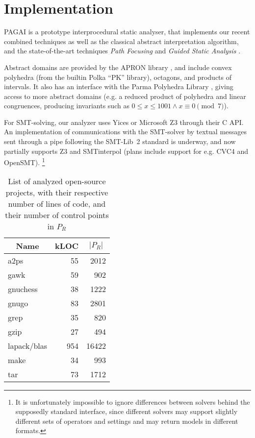 \documentclass{entcs}
\begin{document}
\section{Implementation}

PAGAI is a prototype interprocedural static analyser, that implements our
recent combined techniques \cite{Henry_Monniaux_Moy_SAS12}
as well as the classical abstract interpretation algorithm, and the state-of-the-art techniques \emph{Path Focusing} \cite{Monniaux_Gonnord_SAS11} and \emph{Guided Static Analysis} \cite{DBLP:conf/sas/GopanR07}.

Abstract domains are provided by the APRON library
\citep{DBLP:conf/cav/JeannetM09}, and include convex polyhedra (from the builtin
Polka ``PK'' library), octagons, and products of intervals. It also has
an interface with the Parma Polyhedra Library \cite{BagnaraHZ08SCP}, giving access to
more abstract domains (e.g. a reduced product of polyhedra and linear congruences, producing invariants such as $0 \leq x \leq 1001 \land x \equiv 0 \pmod 7$).

For SMT-solving, our analyzer uses
Yices \cite{DBLP:conf/cav/DutertreM06}
or Microsoft Z3\cite{DBLP:conf/tacas/MouraB08}
through their C API.
An implementation of communications with the SMT-solver by textual messages sent through a pipe following the SMT-Lib~2 standard \cite{BarST-SMTLIB,BarST-SMT-10} is underway, and now partially supports Z3 and SMTinterpol (plans include support for e.g. CVC4 and OpenSMT).%
\footnote{%
It is unfortunately impossible to ignore differences between solvers behind the supposedly standard interface, since different solvers may support slightly different sets of operators and settings and may return models in different formats.}

\begin{table}[!htb]
\begin{center}
\begin{tabular}{|l|r|r|} \hline
	\multicolumn{1}{|c|}{Name} &
        \multicolumn{1}{c|}{kLOC} &
        \multicolumn{1}{c|}{$|P_R|$} \\ \hline
	a2ps & 55 & 2012\\
	gawk & 59 & 902\\ 
	gnuchess & 38 & 1222\\ 
	gnugo & 83 & 2801\\
	grep & 35 & 820\\
	gzip & 27 & 494\\
	lapack/blas & 954 & 16422\\
	make & 34 & 993\\ 
	tar & 73 & 1712\\
	\hline
\end{tabular}
\end{center}

\caption{List of analyzed open-source projects, with their respective number of
lines of code, and their number of control points in $P_R$}
\label{tab:projects}
\end{table}
\end{document}
